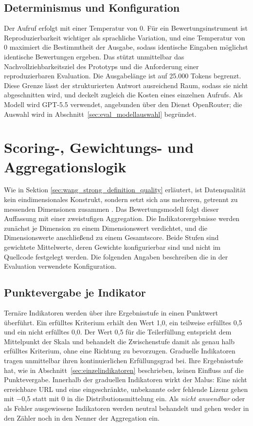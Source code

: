 \subsection{Determinismus und Konfiguration}

Der Aufruf erfolgt mit einer Temperatur von 0. Für ein Bewertungsinstrument ist Reproduzierbarkeit wichtiger als sprachliche Variation, und eine Temperatur von 0 maximiert die Bestimmtheit der Ausgabe, sodass identische Eingaben möglichst identische Bewertungen ergeben. Das stützt unmittelbar das Nachvollziehbarkeitsziel des Prototyps und die Anforderung einer reproduzierbaren Evaluation. Die Ausgabelänge ist auf 25.000 Tokens begrenzt. Diese Grenze lässt der strukturierten Antwort ausreichend Raum, sodass sie nicht abgeschnitten wird, und deckelt zugleich die Kosten eines einzelnen Aufrufs. Als Modell wird GPT-5.5 verwendet, angebunden über den Dienst OpenRouter; die Auswahl wird in Abschnitt~\ref{sec:eval_modellauswahl} begründet. 


\section{Scoring-, Gewichtungs- und Aggregationslogik}

Wie in Sektion \ref{sec:wang_strong_definition_quality} erläutert, ist Datenqualität kein eindimensionales Konstrukt, sondern setzt sich aus mehreren, getrennt zu messenden Dimensionen zusammen \cite{wang1996beyond}. Das Bewertungsmodell folgt dieser Auffassung mit einer zweistufigen Aggregation. Die Indikatorergebnisse werden zunächst je Dimension zu einem Dimensionswert verdichtet, und die Dimensionswerte anschließend zu einem Gesamtscore. Beide Stufen sind gewichtete Mittelwerte, deren Gewichte konfigurierbar sind und nicht im Quellcode festgelegt werden. Die folgenden Angaben beschreiben die in der Evaluation verwendete Konfiguration.

\subsection{Punktevergabe je Indikator}

Ternäre Indikatoren werden über ihre Ergebnisstufe in einen Punktwert überführt. Ein erfülltes Kriterium erhält den Wert 1,0, ein teilweise erfülltes 0,5 und ein nicht erfülltes 0,0. Der Wert 0,5 für die Teilerfüllung entspricht dem Mittelpunkt der Skala und behandelt die Zwischenstufe damit als genau halb erfülltes Kriterium, ohne eine Richtung zu bevorzugen. Graduelle Indikatoren tragen unmittelbar ihren kontinuierlichen Erfüllungsgrad bei. Ihre Ergebnisstufe hat, wie in Abschnitt~\ref{sec:einzelindikatoren} beschrieben, keinen Einfluss auf die Punktevergabe. Innerhalb der graduellen Indikatoren wirkt der Malus: Eine nicht erreichbare URL und eine eingeschränkte, unbekannte oder fehlende Lizenz gehen mit $-$0,5 statt mit 0 in die Distributionsmittelung ein. Als \textit{nicht anwendbar} oder als Fehler ausgewiesene Indikatoren werden neutral behandelt und gehen weder in den Zähler noch in den Nenner der Aggregation ein.

